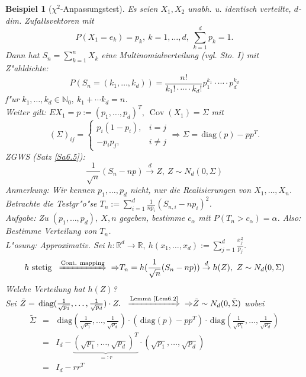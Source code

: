 \documentclass[a4paper,11pt]{scrbook}
\newcommand{\R}{{\mathbb R}}
\newcommand{\N}{{\mathbb N}}
\newcommand{\diag}{\ensuremath{\,\text{diag}}}
\DeclareMathOperator{\cov}{Cov}
\newcommand{\folgtnach}[1]{\ensuremath{\DOTSB\;\xRightarrow{\text{#1}}\;}}
\def\dto{\stackrel{d}{\rightarrow}}
\newtheorem{Bsp}{Beispiel}[chapter]
\theoremstyle{nonumberplain}
\begin{document}
\begin{Bsp}[$\chi^2$-Anpassungstest] \label{Bsp6.1}
Es seien $X_1,X_2$ unabh. u. identisch verteilte, $d$-dim. Zufallsvektoren mit
\[
P(X_1 = e_k) = p_k,\ k=1,\dots,d,\ \sum_{k=1}^d p_k = 1.
\]
Dann hat $S_n = \sum_{k=1}^n X_k$ eine Multinomialverteilung (vgl. Sto. I) mit Z"ahldichte:
\[
P(S_n = (k_1,\dots,k_d)) = \frac{n!}{k_1! \cdot \cdots \cdot k_d!}p_1^{k_1} \cdot \cdots \cdot p_d^{k_d}
\]
f"ur $k_1,\dots,k_d \in \N_0,\ k_1 + \cdots k_d = n$.\\
Weiter gilt: $EX_1 = p := (p_1,\dots,p_d)^T,\ \cov (X_1) = \Sigma$ mit
\[
(\Sigma)_{ij} = \begin{cases}
p_i(1-p_i), & i = j \\
-p_ip_j, & i \not= j
\end{cases}
\Rightarrow \Sigma = \diag(p) - pp^T.
\]
ZGWS (Satz \ref{Sa6.5}):
\[
\frac1{\sqrt{n}} (S_n - np) \dto Z,\ Z \sim N_d(0,\Sigma)
\]
Anmerkung: Wir kennen $p_1,\dots,p_d$ nicht, nur die Realisierungen von $X_1,\dots,X_n$. Betrachte die Testgr"o"se $T_n := \sum_{i=1}^d \frac1{np_i} (S_{n,i} - n p_i)^2$.\\
Aufgabe: Zu $(p_1,\dots,p_d),\ X,n$ gegeben, bestimme $c_{\alpha}$ mit $P(T_n > c_{\alpha}) = \alpha$. Also: Bestimme Verteilung von $T_n$.\\
L"osung: Approximativ. Sei $h: \R^d \rightarrow \R,\ h(x_1,\dots,x_d) := \sum_{j=1}^d \frac{x_j^2}{p_j}$.
\[
h \text{ stetig } \folgtnach{Cont. mapping}{\Rightarrow} T_n =  h(\frac1{\sqrt{n}}(S_n - np)) \dto h(Z),\ Z \sim N_d (0,\Sigma)
\]
Welche Verteilung hat $h(Z)$?\\
Sei $\tilde{Z} = \diag (\frac1{\sqrt{p_1}},\dots,\frac1{\sqrt{p_d}}) \cdot Z.\ \folgtnach{Lemma \ref{Lem6.2}}{\Rightarrow} \tilde{Z} \sim N_d(0,\tilde{\Sigma})$ wobei
\begin{eqnarray*}
\tilde{\Sigma} & = & \diag (\frac1{\sqrt{p_1}},\dots,\frac1{\sqrt{p_d}}) \cdot (\diag (p)-pp^T) \cdot \diag (\frac1{\sqrt{p_1}},\dots,\frac1{\sqrt{p_d}}) \\
& = & I_d - \underbrace{(\sqrt{p_1},\dots,\sqrt{p_d})^T}_{=: r} \cdot (\sqrt{p_1},\dots,\sqrt{p_d}) \\
& = & I_d - rr^T
\end{eqnarray*}


\end{Bsp}
\end{document}
